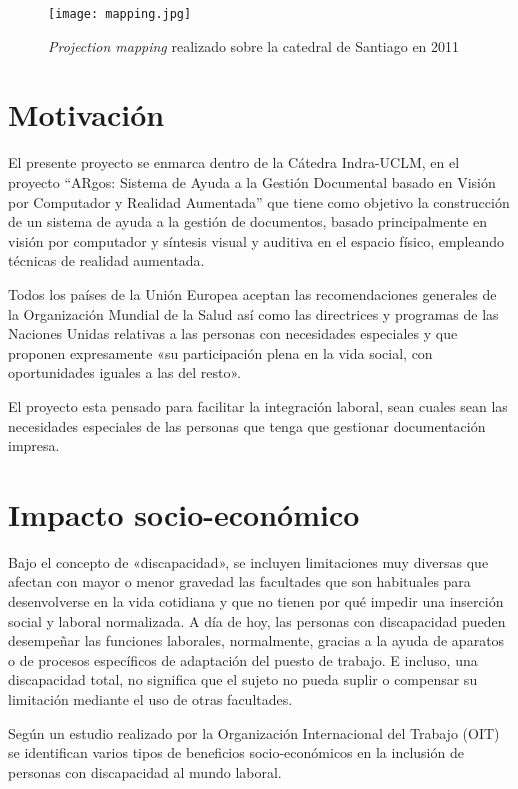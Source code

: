 \begin{figure} 
  \centering
  \texttt{[image: mapping.jpg]}
  \caption{\textit{Projection mapping} realizado sobre la catedral de Santiago en 2011}
  \label{fig:mapping}
\end{figure}

\section{Motivación}

El presente proyecto se enmarca dentro de la Cátedra Indra-UCLM, en el proyecto “ARgos: Sistema de Ayuda a la Gestión Documental basado en Visión por Computador y Realidad Aumentada” que tiene como objetivo la construcción de un sistema de ayuda a la gestión de documentos, basado principalmente en visión por computador y síntesis visual y auditiva en el espacio físico, empleando técnicas de realidad aumentada. 

Todos los países de la Unión Europea aceptan las recomendaciones generales de la Organización Mundial de la Salud así como las directrices y programas de las Naciones Unidas relativas a las personas con necesidades especiales y que proponen expresamente «su participación plena en la vida social, con oportunidades iguales a las del resto». 

El proyecto esta pensado para facilitar la integración laboral, sean cuales sean las necesidades especiales de las personas que tenga que gestionar documentación impresa. 
  
\section{Impacto socio-económico}
Bajo el concepto de «discapacidad», se incluyen limitaciones muy diversas que afectan con mayor o menor gravedad las facultades que son habituales para desenvolverse en la vida cotidiana y que no tienen por qué impedir una inserción social y laboral normalizada. A día de hoy, las personas con discapacidad pueden desempeñar las funciones laborales, normalmente, gracias a la ayuda de aparatos o de procesos específicos de adaptación del puesto de trabajo. E incluso, una discapacidad total, no significa que el sujeto no pueda suplir o compensar su limitación mediante el uso de otras facultades. 

Según un estudio \cite{OIT} realizado por la Organización Internacional del Trabajo (OIT) se identifican varios tipos de beneficios socio-económicos en la inclusión de personas con discapacidad al mundo laboral.

